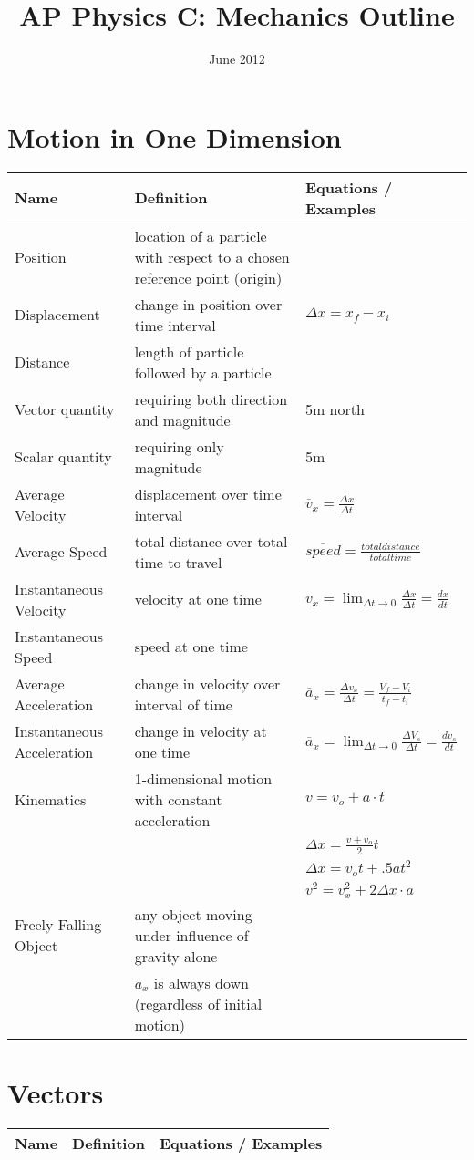 \documentclass[11pt]{article}
\title{AP Physics C: Mechanics Outline}
\date{June 2012}
\begin{document}
\maketitle
\pagebreak

\section{Motion in One Dimension}
\begin{tabularx}{\textwidth}{l| X l}
    Name & Definition & Equations / Examples \\ \hline
    Position & location of a particle with respect to a chosen reference point (origin) & \\ \hline
    Displacement & change in position over time interval & $ \Delta x=x_{f} - x_{i} $ \bigstrut \\ \hline
    Distance & length of particle followed by a particle & \\ \hline
    Vector quantity & requiring both direction and magnitude & 5m north \\ \hline
    Scalar quantity & requiring only magnitude & 5m \\ \hline
    Average Velocity & displacement over time interval & $ \overline{v}_{x} = \frac{ \Delta x}{ \Delta t } $ \bigstrut \\ \hline
    Average Speed & total distance over total time to travel & $ \overline{speed} = \frac{ total distance }{ total time } $ \bigstrut \\ \hline
    Instantaneous Velocity & velocity at one time & $ v_{x} = \lim_{ \Delta t \to 0} \frac{\Delta x}{\Delta t} = \frac{dx}{dt} $ \bigstrut \\ \hline
    Instantaneous Speed & speed at one time & \\ \hline
    Average Acceleration & change in velocity over interval of time & $ \overline{a}_{x} = \frac{\Delta v_{x}}{\Delta t} = \frac{V_{f}-V_{i}}{t_{f}-t_{i}} $ \bigstrut \\ \hline
    Instantaneous Acceleration & change in velocity at one time & $ \overline{a}_{x} = \lim_{\Delta t \to 0} \frac{\Delta V_{s}}{\Delta t} = \frac{dv_{s}}{dt} $ \bigstrut \\ \hline
    Kinematics & 1-dimensional motion with constant acceleration & $ v= v_{o} + a \cdot t $ \\* & & $ \Delta x = \frac{v + v_{o}}{2}t $ \\* & & $ \Delta x = v_{o}t + .5at^{2} $ \\* & & $ v^{2} = v^{2}_{x}+ 2\Delta x \cdot a$ \bigstrut \\ \hline
    Freely Falling Object & any object moving under influence of gravity alone \\* & $ a_{x} $ is always down (regardless of initial motion) \\ \hline
\end{tabularx}

\section{Vectors}
\begin{tabularx}{\textwidth}{l| X l}
    Name & Definition & Equations / Examples \\ \hline
\end{tabularx}
\end{document}
